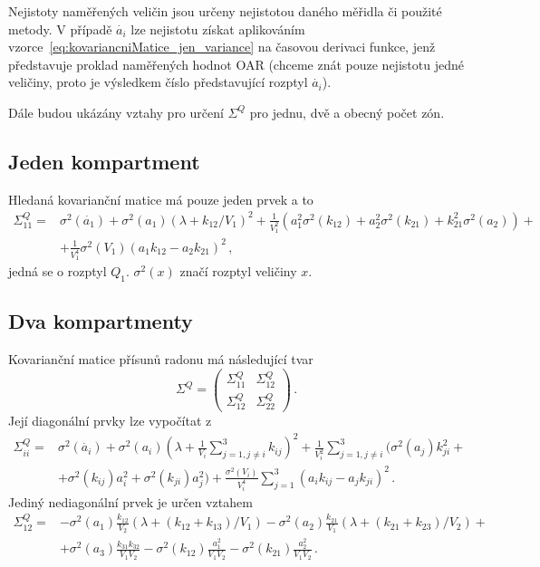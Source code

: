 Nejistoty naměřených veličin jsou určeny nejistotou daného měřidla či použité metody. V případě $\dot{a_i}$ lze nejistotu získat aplikováním vzorce~\eqref{eq:kovariancniMatice_jen_variance} na časovou derivaci funkce, jenž představuje proklad naměřených hodnot OAR (chceme znát pouze nejistotu jedné veličiny, proto je výsledkem číslo představující rozptyl $\dot{a_i}$).

Dále budou ukázány vztahy pro určení $\Sigma^Q$ pro jednu, dvě a obecný počet zón.
\subsection{Jeden kompartment}
Hledaná kovarianční matice má pouze jeden prvek a to
\begin{align}
    \Sigma_{11}^Q=&\sigma^2(\dot{a_1}) + \sigma^2(a_1)(\lambda + k_{12}/V_1)^2 + \frac{1}{V_1^2}\left(a_1^2\sigma^2(k_{12}) + a_2^2\sigma^2(k_{21}) + k_{21}^2\sigma^2(a_2)\right) +\nonumber\\
    &+\frac{1}{V_1^4}\sigma^2(V_1)(a_1 k_{12} - a_2k_{21})^2\,,
    \label{eq:nejistota_jednaZona}
\end{align}
jedná se o rozptyl $Q_1$. $\sigma^2(x)$ značí rozptyl veličiny $x$.
\subsection{Dva kompartmenty}
Kovarianční matice přísunů radonu má následující tvar
\begin{equation}
    \Sigma^Q=\begin{pmatrix}
        \Sigma^Q_{11}&\Sigma^Q_{12}\\
        \Sigma^Q_{12}&\Sigma^Q_{22}
    \end{pmatrix}\,.
\end{equation}
Její diagonální prvky lze vypočítat z
\begin{align}
    \Sigma_{ii}^Q=&\sigma^2(\dot{a_i}) + \sigma^2(a_i)\left(\lambda + \frac{1}{V_i}\sum_{j=1,j\neq i}^{3}k_{ij}\right)^2 + \frac{1}{V_i^2}\sum_{j=1,j\neq i}^{3}\big(\sigma^2(a_j)k_{ji}^2 + \nonumber\\
    &+ \sigma^2(k_{ij})a_i^2 + \sigma^2(k_{ji})a_j^2\big) + \frac{\sigma^2(V_i)}{V_i^4}\sum_{j=1}^{3}\left(a_i k_{ij} -a_j k_{ji}\right)^2\,.
    \label{eq:nejistota_dveZony}
\end{align}
Jediný nediagonální prvek je určen vztahem
\begin{align}
    \Sigma_{12}^Q=&-\sigma^2(a_1)\frac{k_{12}}{V_2}(\lambda + (k_{12} + k_{13})/V_1) - \sigma^2(a_2)\frac{k_{21}}{V_1}(\lambda + (k_{21} + k_{23})/V_2)+\nonumber\\
    &+ \sigma^2(a_3)\frac{k_{31}k_{32}}{V_1V_2} - \sigma^2(k_{12})\frac{a_1^2}{V_1V_2} - \sigma^2(k_{21})\frac{a_2^2}{V_1V_2}\,.
\end{align}
